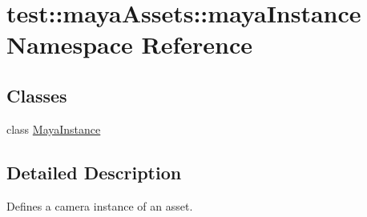 \hypertarget{namespacetest_1_1mayaAssets_1_1mayaInstance}{\section{test\-:\-:maya\-Assets\-:\-:maya\-Instance \-Namespace \-Reference}
\label{d1/d09/namespacetest_1_1mayaAssets_1_1mayaInstance}
}
\subsection*{\-Classes}
\begin{DoxyCompactItemize}
\item 
class \hyperlink{classtest_1_1mayaAssets_1_1mayaInstance_1_1MayaInstance}{\-Maya\-Instance}
\end{DoxyCompactItemize}


\subsection{\-Detailed \-Description}
\begin{DoxyVerb}
Defines a camera instance of an asset.
\end{DoxyVerb}
 